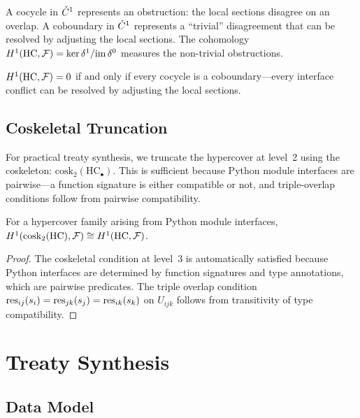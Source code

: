 \documentclass[11pt]{article}
\newcommand{\HC}{\mathrm{HC}}
\newcommand{\cosk}{\mathrm{cosk}}
\newcommand{\Sect}{\mathcal{F}}             %
\begin{document}
A cocycle in $\check{C}^1$ represents an obstruction: the local sections
disagree on an overlap.  A coboundary in $\check{C}^1$ represents a
``trivial'' disagreement that can be resolved by adjusting the local
sections.  The cohomology $\Hcoh{1}(\HC, \Sect) = \ker \delta^1 /
\mathrm{im}\, \delta^0$ measures the non-trivial obstructions.

\begin{proposition}\label{prop:vanish}
$\Hcoh{1}(\HC, \Sect) = 0$ if and only if every cocycle is a
coboundary---\ie every interface conflict can be resolved by
adjusting the local sections.
\end{proposition}

\subsection{Coskeletal Truncation}

For practical treaty synthesis, we truncate the hypercover at
level~2 using the coskeleton:
$\cosk_2(\HC_\bullet)$.  This is sufficient because
Python module interfaces are pairwise---a function signature is
either compatible or not, and triple-overlap conditions follow from
pairwise compatibility.

\begin{lemma}\label{lem:cosk}
For a hypercover family arising from Python module interfaces,
$\Hcoh{1}(\cosk_2(\HC), \Sect) \cong \Hcoh{1}(\HC, \Sect)$.
\end{lemma}

\begin{proof}
The coskeletal condition at level~3 is automatically satisfied
because Python interfaces are determined by function signatures
and type annotations, which are pairwise predicates.  The triple
overlap condition $\mathrm{res}_{ij}(s_i) = \mathrm{res}_{jk}(s_j) = \mathrm{res}_{ik}(s_k)$
on $U_{ijk}$ follows from transitivity of type compatibility.
\end{proof}

\section{Treaty Synthesis}\label{sec:synthesis}

\subsection{Data Model}
\end{document}
